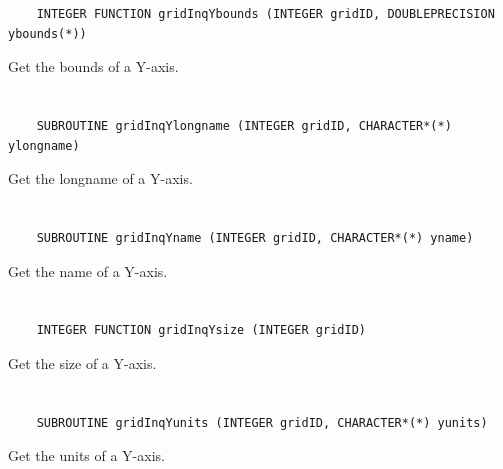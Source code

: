 \begin{verbatim}
    INTEGER FUNCTION gridInqYbounds (INTEGER gridID, DOUBLEPRECISION ybounds(*))
\end{verbatim}

Get the bounds of a Y-axis.


\section*{\tt {}}

\begin{verbatim}
    SUBROUTINE gridInqYlongname (INTEGER gridID, CHARACTER*(*) ylongname)
\end{verbatim}

Get the longname of a Y-axis.


\section*{\tt {}}

\begin{verbatim}
    SUBROUTINE gridInqYname (INTEGER gridID, CHARACTER*(*) yname)
\end{verbatim}

Get the name of a Y-axis.


\section*{\tt {}}

\begin{verbatim}
    INTEGER FUNCTION gridInqYsize (INTEGER gridID)
\end{verbatim}

Get the size of a Y-axis.


\section*{\tt {}}

\begin{verbatim}
    SUBROUTINE gridInqYunits (INTEGER gridID, CHARACTER*(*) yunits)
\end{verbatim}

Get the units of a Y-axis.


\section*{\tt {}}

